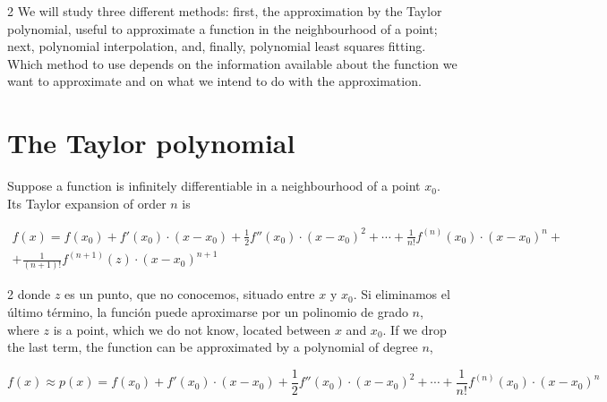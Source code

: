 \begin{paracol}{2}
We will study three different methods: first, the approximation by the Taylor polynomial, useful to approximate a function in the neighbourhood of a point; next, polynomial interpolation, and, finally, polynomial least squares fitting. Which method to use depends on the information available about the function we want to approximate and on what we intend to do with the approximation.

\section{The Taylor polynomial}
Suppose a function is infinitely differentiable in a neighbourhood of a point $x_0$. Its Taylor expansion of order $n$ is
\end{paracol}
\begin{multline*}
f(x)=f(x_0)+f'(x_0)\cdot (x-x_0)+\frac{1}{2} f''(x_0)\cdot (x-x_0)^2+\cdots + \frac{1}{n!}f^{(n)}(x_0)\cdot (x-x_0)^n+\\ + \frac{1}{(n+1)!}f^{(n+1)}(z)\cdot (x-x_0)^{n+1}
\end{multline*}

\begin{paracol}{2}
donde $z$ es un punto, que no conocemos, situado entre $x$ y $x_0$. Si eliminamos el último término, la función puede aproximarse por un polinomio de grado $n$,
\switchcolumn
where $z$ is a point, which we do not know, located between $x$ and $x_0$. If we drop the last term, the function can be approximated by a polynomial of degree $n$,
\end{paracol}

\begin{equation*}
f(x)\approx p(x)= f(x_0)+f'(x_0)\cdot (x-x_0)+\frac{1}{2}f''(x_0)\cdot (x-x_0)^2+\cdots + \frac{1}{n!}f^{(n)}(x_0)\cdot (x-x_0)^n
\end{equation*}

